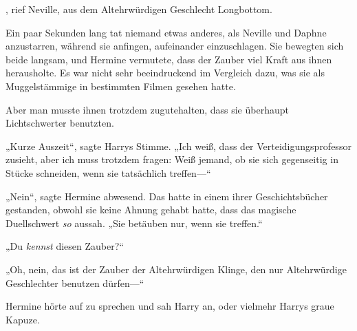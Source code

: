 , rief Neville, aus dem Altehrwürdigen Geschlecht Longbottom. 

\later

Ein paar Sekunden lang tat niemand etwas anderes, als Neville und Daphne anzustarren, während sie anfingen, aufeinander einzuschlagen. Sie bewegten sich beide langsam, und Hermine vermutete, dass der Zauber viel Kraft aus ihnen herausholte. Es war nicht sehr beeindruckend im Vergleich dazu, was sie als Muggelstämmige in bestimmten Filmen gesehen hatte.

Aber man musste ihnen trotzdem zugutehalten, dass sie überhaupt Lichtschwerter benutzten.

„Kurze Auszeit“, sagte Harrys Stimme. „Ich weiß, dass der Verteidigungsprofessor zusieht, aber ich muss trotzdem fragen: Weiß jemand, ob sie sich gegenseitig in Stücke schneiden, wenn sie tatsächlich treffen—“

„Nein“, sagte Hermine abwesend. Das hatte in einem ihrer Geschichtsbücher gestanden, obwohl sie keine Ahnung gehabt hatte, dass das magische Duellschwert \emph{so} aussah. „Sie betäuben nur, wenn sie treffen.“

„Du \emph{kennst} diesen Zauber?“

„Oh, nein, das ist der Zauber der Altehrwürdigen Klinge, den nur Altehrwürdige Geschlechter benutzen dürfen—“

Hermine hörte auf zu sprechen und sah Harry an, oder vielmehr Harrys graue Kapuze.

